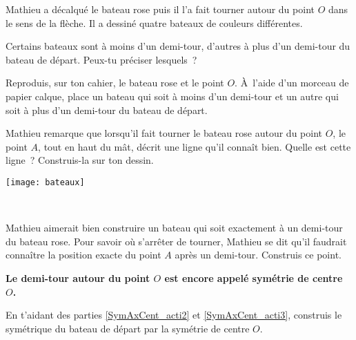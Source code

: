 \begin{activite}

Mathieu a décalqué le bateau rose puis il l'a fait tourner autour du point $O$ dans le sens de la flèche. Il a dessiné quatre bateaux de couleurs différentes.

\begin{minipage}[c]{0.42\linewidth}
\begin{partie}
Certains bateaux sont à moins d'un demi-tour, d'autres à plus d'un demi-tour du bateau de départ. Peux-tu préciser lesquels ?
\end{partie}

\begin{partie}
Reproduis, sur ton cahier, le bateau rose et le point $O$. À l'aide d'un morceau de papier calque, place un bateau qui soit à moins d'un demi-tour et un autre qui soit à plus d'un demi-tour du bateau de départ.
\end{partie}

\begin{partie} \label{SymAxCent_acti2}
Mathieu remarque que lorsqu'il fait tourner le bateau rose autour du point $O$, le point $A$, tout en haut du mât, décrit une ligne qu'il connaît bien. Quelle est cette ligne ? Construis-la sur ton dessin.
\end{partie}
 \end{minipage}
   \quad \begin{minipage}[c]{0.36\linewidth}
  \texttt{[image: bateaux]}
  \end{minipage} \\

\begin{partie} \label{SymAxCent_acti3}
Mathieu aimerait bien construire un bateau qui soit exactement à un demi-tour du bateau rose. Pour savoir où s'arrêter de tourner, Mathieu se dit qu'il faudrait connaître la position exacte du point $A$ après un demi-tour. Construis ce point.
\begin{center} \textbf{\textcolor{H1}{Le demi-tour autour du point $O$ est encore appelé symétrie de centre $O$.}} \end{center}
\end{partie}

\begin{partie}
En t'aidant des parties \ref{SymAxCent_acti2} et \ref{SymAxCent_acti3}, construis le symétrique du bateau de départ par la symétrie de centre $O$.
\end{partie}

\end{activite}

